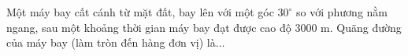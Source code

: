 \begin{ex}%
	Một máy bay cất cánh từ mặt đất, bay lên với một góc $30^\circ$ so với phương nằm ngang, sau một khoảng thời gian máy bay đạt được cao độ $3000$ m. Quãng đường của máy bay (làm tròn đến hàng đơn vị) là$\ldots$
\end{ex}
